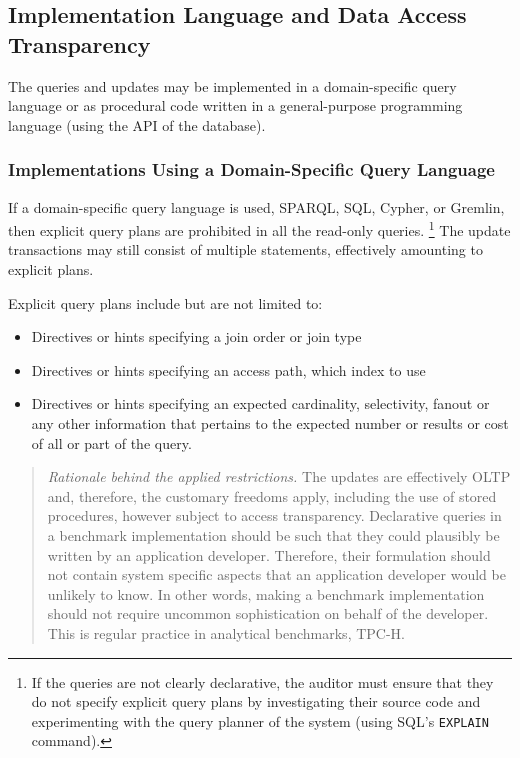 \subsection{Implementation Language and Data Access Transparency}

The queries and updates may be implemented in a domain-specific query language or as procedural code written in a general-purpose programming language (\eg using the API of the database).

\subsubsection{Implementations Using a Domain-Specific Query Language}
\label{sec:snb-domain-specific-query-language}

If a domain-specific query language is used, \eg SPARQL, SQL, Cypher, or Gremlin, then explicit query plans are prohibited in all the read-only queries.%
\footnote{If the queries are not clearly declarative, the auditor must ensure that they do not specify explicit query plans by investigating their source code and experimenting with the query planner of the system (\eg using SQL's \texttt{EXPLAIN} command).}
The update transactions may still consist of multiple statements, effectively amounting to explicit plans.

Explicit query plans include but are not limited to:
\begin{itemize}
    \item Directives or hints specifying a join order or join type
    \item Directives or hints specifying an access path, \eg which index to use
    \item Directives or hints specifying an expected cardinality, selectivity, fanout or any other information that pertains to the expected number or results or cost of all or part of the query.
\end{itemize}

\begin{quote}
    \emph{Rationale behind the applied restrictions.} The updates are effectively OLTP and, therefore, the customary freedoms apply, including the use of stored procedures, however subject to access transparency. Declarative queries in a benchmark implementation should be such that they could plausibly be written by an application developer. Therefore, their formulation should not contain system specific aspects that an application developer would be unlikely to know. In other words, making a benchmark implementation should not require uncommon sophistication on behalf of the developer. This is regular practice in analytical benchmarks, \eg \mbox{TPC-H}.
\end{quote}

